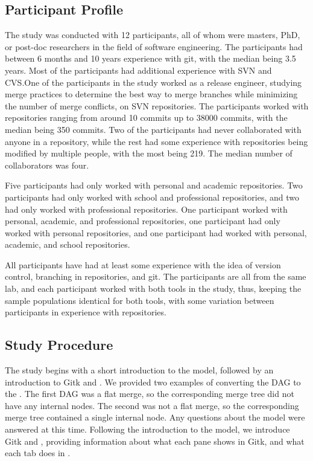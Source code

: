 \subsection{Participant Profile}
\label{sub:participant_profile}

The study was conducted with 12 participants, all of whom were
masters, PhD, or post-doc researchers in the field of software
engineering. The participants had between 6 months and 10 years
experience with git, with the median being 3.5 years. Most of the
participants had additional experience with SVN and CVS.\@ One of the
participants in the study worked as a release engineer, studying merge
practices to determine the best way to merge branches while minimizing
the number of merge conflicts, on SVN repositories. The participants
worked with repositories ranging from around 10 commits up to 38000
commits, with the median being 350 commits. Two of the participants had
never collaborated with anyone in a repository, while the rest had some
experience with repositories being modified by multiple people, with the
most being 219. The median number of collaborators was four.

Five participants had only worked with personal and academic
repositories. Two participants had only worked with school and
professional repositories, and two had only worked with professional
repositories. One participant worked with personal, academic, and
professional repositories, one participant had only worked with personal
repositories, and one participant had worked with personal, academic,
and school repositories.


All participants have had at least some experience with the idea of
version control, branching in repositories, and git. The participants
are all from the same lab, and each participant worked with both tools
in the study, thus, keeping the sample populations identical for both
tools, with some variation between participants in experience with
repositories.

\subsection{Study Procedure}
\label{sub:study_procedure}

The study begins with a short introduction to the \mt model, followed by
an introduction to Gitk and \tool. We provided two examples of
converting the DAG to the \mt. The first DAG was a flat merge, so the
corresponding merge tree did not have any internal nodes. The second was
not a flat merge, so the corresponding merge tree contained a single
internal node. Any questions about the model were answered at this time.
Following the introduction to the \mt model, we introduce Gitk and
\tool, providing information about what each pane shows in Gitk, and
what each tab does in \tool.

